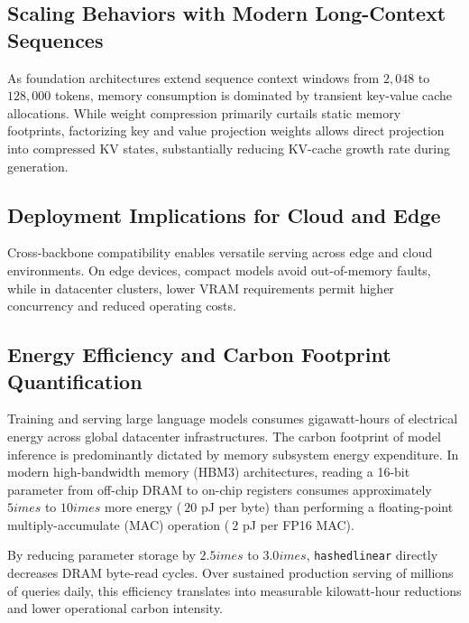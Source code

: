 \subsection{Scaling Behaviors with Modern Long-Context Sequences}
As foundation architectures extend sequence context windows from $2{,}048$ to $128{,}000$ tokens, memory consumption is dominated by transient key-value cache allocations. While weight compression primarily curtails static memory footprints, factorizing key and value projection weights allows direct projection into compressed KV states, substantially reducing KV-cache growth rate during generation.

\subsection{Deployment Implications for Cloud and Edge}
Cross-backbone compatibility enables versatile serving across edge and cloud environments. On edge devices, compact models avoid out-of-memory faults, while in datacenter clusters, lower VRAM requirements permit higher concurrency and reduced operating costs.

\subsection{Energy Efficiency and Carbon Footprint Quantification}
Training and serving large language models consumes gigawatt-hours of electrical energy across global datacenter infrastructures. The carbon footprint of model inference is predominantly dictated by memory subsystem energy expenditure. In modern high-bandwidth memory (HBM3) architectures, reading a 16-bit parameter from off-chip DRAM to on-chip registers consumes approximately $5	imes$ to $10	imes$ more energy ($~20$ pJ per byte) than performing a floating-point multiply-accumulate (MAC) operation ($~2$ pJ per FP16 MAC).

By reducing parameter storage by $2.5	imes$ to $3.0	imes$, \texttt{hashedlinear} directly decreases DRAM byte-read cycles. Over sustained production serving of millions of queries daily, this efficiency translates into measurable kilowatt-hour reductions and lower operational carbon intensity.
